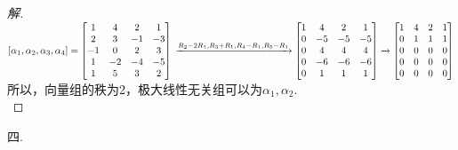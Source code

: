 \documentclass[10pt,a4paper]{report}
\begin{document}
\begin{proof}[解]
	$[\alpha_{1}, \alpha_{2}, \alpha_{3}, \alpha_{4}] = \left[
	\begin{matrix}
	1 & 4 & 2 & 1\\
	2 & 3 & -1 & -3\\
	-1 & 0 & 2 & 3\\
	1 & -2 & -4 & -5\\
	1 & 5 & 3 & 2
	\end{matrix}
	\right]\\
	\xrightarrow{R_{2}-2R_{1},R_{3}+R_{1},R_{4}-R_{1},R_{5}-R_{1}}
	\left[
	\begin{matrix}
	1 & 4 & 2 & 1\\
	0 & -5 & -5 & -5\\
	0 & 4 & 4 & 4\\
	0 & -6 & -6 & -6\\
	0 & 1 & 1 & 1
	\end{matrix}
	\right] \xrightarrow{} \left[
	\begin{matrix}
	1 & 4 & 2 & 1\\
	0 & 1 & 1 & 1\\
	0 & 0 & 0 & 0\\
	0 & 0 & 0 & 0\\
	0 & 0 & 0 & 0
	\end{matrix}
	\right]$\\
	所以，向量组的秩为2，极大线性无关组可以为$\alpha_{1},\alpha_{2}$.\\
\end{proof}
\noindent 四.\\
\end{document}
